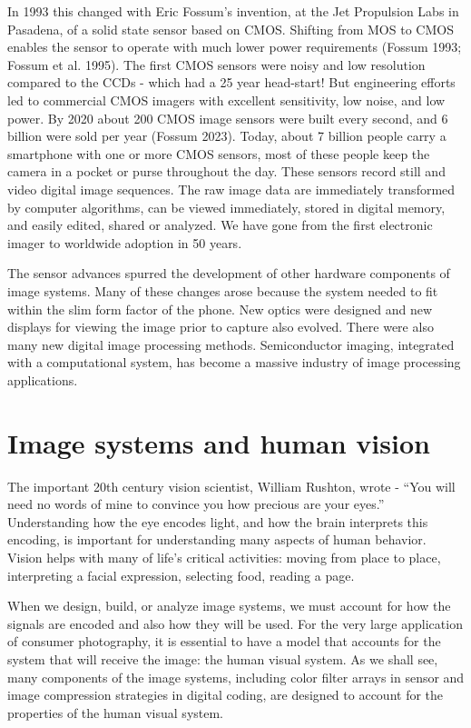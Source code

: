 \documentclass[
  letterpaper,
]{book}
\begin{document}
In 1993 this changed with Eric Fossum's invention, at the Jet Propulsion
Labs in Pasadena, of a solid state sensor based on CMOS. Shifting from
MOS to CMOS enables the sensor to operate with much lower power
requirements (Fossum 1993; Fossum et al. 1995). The first CMOS sensors
were noisy and low resolution compared to the CCDs - which had a 25 year
head-start! But engineering efforts led to commercial CMOS imagers with
excellent sensitivity, low noise, and low power. By 2020 about 200 CMOS
image sensors were built every second, and 6 billion were sold per year
(Fossum 2023). Today, about 7 billion people carry a smartphone with one
or more CMOS sensors, most of these people keep the camera in a pocket
or purse throughout the day. These sensors record still and video
digital image sequences. The raw image data are immediately transformed
by computer algorithms, can be viewed immediately, stored in digital
memory, and easily edited, shared or analyzed. We have gone from the
first electronic imager to worldwide adoption in 50 years.

The sensor advances spurred the development of other hardware components
of image systems. Many of these changes arose because the system needed
to fit within the slim form factor of the phone. New optics were
designed and new displays for viewing the image prior to capture also
evolved. There were also many new digital image processing methods.
Semiconductor imaging, integrated with a computational system, has
become a massive industry of image processing applications.

\section{Image systems and human
vision}\label{image-systems-and-human-vision}

The important 20th century vision scientist, William Rushton, wrote -
``You will need no words of mine to convince you how precious are your
eyes.'' Understanding how the eye encodes light, and how the brain
interprets this encoding, is important for understanding many aspects of
human behavior. Vision helps with many of life's critical activities:
moving from place to place, interpreting a facial expression, selecting
food, reading a page.

When we design, build, or analyze image systems, we must account for how
the signals are encoded and also how they will be used. For the very
large application of consumer photography, it is essential to have a
model that accounts for the system that will receive the image: the
human visual system. As we shall see, many components of the image
systems, including color filter arrays in sensor and image compression
strategies in digital coding, are designed to account for the properties
of the human visual system.
\end{document}
